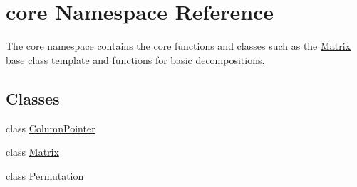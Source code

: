 \hypertarget{namespacecore}{}\section{core Namespace Reference}
\label{namespacecore}


The core namespace contains the core functions and classes such as the \mbox{\hyperlink{classcore_1_1_matrix}{Matrix}} base class template and functions for basic decompositions.  


\subsection*{Classes}
\begin{DoxyCompactItemize}
\item 
class \mbox{\hyperlink{classcore_1_1_column_pointer}{Column\+Pointer}}
\item 
class \mbox{\hyperlink{classcore_1_1_matrix}{Matrix}}
\item 
class \mbox{\hyperlink{classcore_1_1_permutation}{Permutation}}
\end{DoxyCompactItemize}
